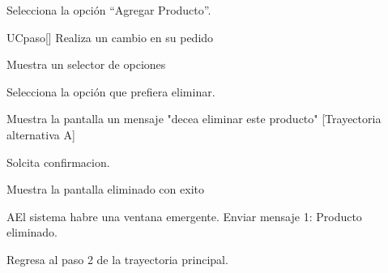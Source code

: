 \begin{UCtrayectoria}
	
	\UCpaso[\UCactor] Selecciona la opción “Agregar Producto”.

	UCpaso[\UCactor] Realiza un cambio en su pedido
	
	\UCpaso[\UCsist]  Muestra un selector de opciones 
	
	\UCpaso[\UCsist] Selecciona la opción que prefiera eliminar. 
	
	\UCpaso[\UCsist] Muestra la pantalla un mensaje "decea eliminar este producto" [Trayectoria alternativa A]
	
	\UCpaso[\UCsist] Solcita confirmacion.
	
	\UCpaso[\UCsist] Muestra la pantalla eliminado con exito
	
\end{UCtrayectoria}

\begin{UCtrayectoriaA}{A}{El sistema habre una ventana emergente.}
	\UCpaso[\UCsist] Enviar mensaje 1: Producto eliminado.
			
	\UCpaso[] Regresa al paso 2 de la trayectoria principal.
	
\end{UCtrayectoriaA}
